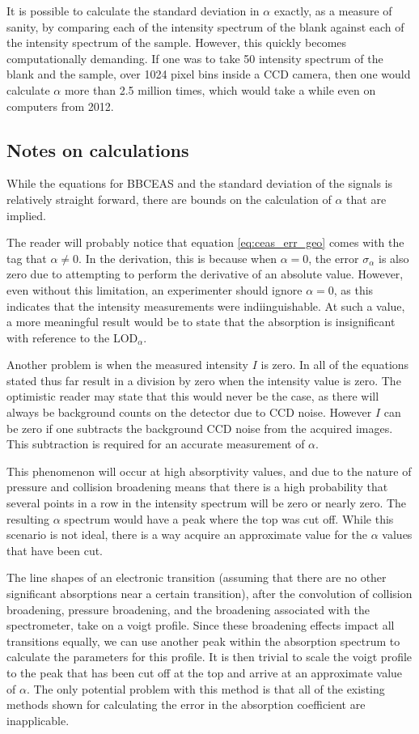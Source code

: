 It is possible to calculate the standard deviation in $\alpha$ exactly, as a
measure of sanity, by comparing each of the intensity spectrum of the
blank against each of the intensity spectrum of the sample. However, this
quickly becomes computationally demanding. If one was to take 50
intensity spectrum of the blank and the sample, over 1024 pixel bins inside a
CCD camera, then one would calculate $\alpha$ more than 2.5 million times,
which would take a while even on computers from 2012.

\subsection{Notes on calculations}

While the equations for \ac{BBCEAS} and the standard deviation of the signals
is relatively straight forward, there are bounds on the calculation of
$\alpha$ that are implied.

The reader will probably notice that equation \eqref{eq:ceas_err_geo} comes
with the tag that $\alpha \neq 0$. In the derivation, this is because when
$\alpha = 0$, the error $\sigma_{\alpha}$ is also zero due to attempting to
perform the derivative of an absolute value. However, even without this
limitation, an experimenter should ignore $\alpha = 0$, as this indicates
that the intensity measurements were indiinguishable. At such a value, a more
meaningful result would be to state that the absorption is insignificant with
reference to the LOD$_{\alpha}$.

Another problem is when the measured intensity $I$ is zero. In all of the
equations stated thus far result in a division by zero when the intensity
value is zero. The optimistic reader may state that this would never be
the case, as there will always be background counts on the detector due to
\ac{CCD} noise. However $I$ can be zero if one subtracts the background
\ac{CCD} noise from the acquired images. This subtraction is required for an
accurate measurement of $\alpha$.

This phenomenon will occur at high absorptivity values, and due to the nature
of pressure and collision broadening means that there is a high probability
that several points in a row in the intensity spectrum will be zero or nearly
zero. The resulting $\alpha$ spectrum would have a peak where the top was cut
off. While this scenario is not ideal, there is a way acquire an approximate
value for the $\alpha$ values that have been cut.

The line shapes of an electronic transition (assuming that there are no other
significant absorptions near a certain transition), after the convolution of
collision broadening, pressure broadening, and the broadening associated with
the spectrometer, take on a voigt profile. Since these broadening effects
impact all transitions equally, we can use another peak within the absorption
spectrum to calculate the parameters for this profile. It is then trivial to
scale the voigt profile to the peak that has been cut off at the top and
arrive at an approximate value of $\alpha$. The only potential problem with
this method is that all of the existing methods shown for calculating the
error in the absorption coefficient are inapplicable.

